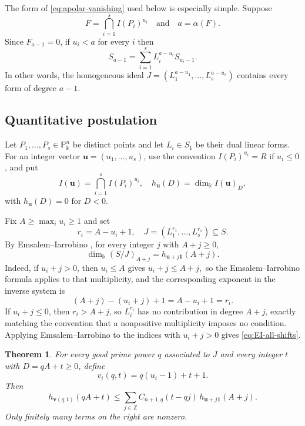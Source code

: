 \documentclass[11pt]{amsart}
\newtheorem{theorem}{Theorem}[section]
\theoremstyle{remark}
\newcommand{\PP}{\mathbb P}
\newcommand{\kk}{\Bbbk}
\newcommand{\ZZ}{\mathbb Z}
\begin{document}
The form of \eqref{eq:apolar-vanishing} used below is especially simple. Suppose
$$
F=\bigcap_{i=1}^s I(P_i)^{u_i}
\quad\text{and}\quad
a=\alpha(F).
$$
Since $F_{a-1}=0$, if $u_i<a$ for every $i$ then
\begin{equation}\label{eq:source-spanning}
S_{a-1}
=
\sum_{i=1}^s L_i^{a-u_i}S_{u_i-1}.
\end{equation}
In other words, the homogeneous ideal
$
J=(L_1^{a-u_1},\ldots,L_s^{a-u_s})
$
contains every form of degree $a-1$. 


\subsection{Quantitative postulation}


Let $P_1,\ldots,P_s\in\PP_\kk^n$ be distinct points and let $L_i\in S_1$ be their dual linear forms. For an integer vector $\mathbf u=(u_1,\ldots,u_s)$, use the convention $I(P_i)^{u_i}=R$ if $u_i\le0$, and put
$$
I(\mathbf u)=\bigcap_{i=1}^sI(P_i)^{u_i},
\quad
h_{\mathbf u}(D)=\dim_{\kk} I(\mathbf u)_D,
$$
with $h_{\mathbf u}(D)=0$ for $D<0$.

Fix $A\ge\max_i u_i\ge1$ and set
$$
r_i=A-u_i+1,
\quad
J=(L_1^{r_1},\ldots,L_s^{r_s})\subseteq S.
$$
By Emsalem--Iarrobino \cite[Theorem~I]{EI}, for every integer $j$ with $A+j\ge0$,
\begin{equation}\label{eq:EI-all-shifts}
\dim_{\kk}(S/J)_{A+j}
=
h_{\mathbf u+j\mathbf1}(A+j).
\end{equation}
Indeed, if $u_i+j>0$, then $u_i\le A$ gives
$
u_i+j\le A+j,
$
so the Emsalem--Iarrobino formula applies to that multiplicity, and the corresponding exponent in the inverse system is
$$
(A+j)-(u_i+j)+1=A-u_i+1=r_i.
$$
If $u_i+j\le0$, then $r_i>A+j$, so $L_i^{r_i}$ has no contribution in degree $A+j$, exactly matching the convention that a nonpositive multiplicity imposes no condition. Applying Emsalem--Iarrobino to the indices with $u_i+j>0$ gives \eqref{eq:EI-all-shifts}.

\begin{theorem}\label{thm:fatpoint-HF}
For every good prime power $q$ associated to $J$ and every integer $t$ with $D=qA+t\ge0$, define
$$
v_i(q,t)=q(u_i-1)+t+1.
$$
Then
\begin{equation}\label{eq:fatpoint-HF}
h_{\mathbf v(q,t)}(qA+t)
\le
\sum_{j\in\ZZ}
C_{n+1,q}(t-qj)
\,h_{\mathbf u+j\mathbf1}(A+j).
\end{equation}
Only finitely many terms on the right are nonzero.
\end{theorem}
\end{document}
